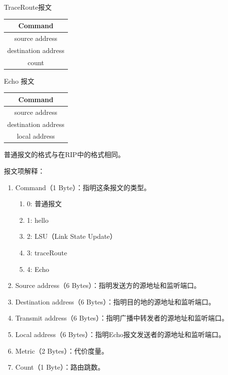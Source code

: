 TraceRoute报文
\begin{table}[H]
	\centering
	\begin{tabular}{|c|}
		\hline              
		Command             \\
		\hline              
		source address      \\
		\hline              
		destination address \\
		\hline              
		count               \\
		\hline              
	\end{tabular}		
\end{table}	

Echo 报文
\begin{table}[H]
	\centering
	\begin{tabular}{|c|}
		\hline              
		Command             \\
		\hline              
		source address      \\
		\hline              
		destination address \\
		\hline              
		local address       \\
		\hline              
	\end{tabular}		
\end{table}
普通报文的格式与在RIP中的格式相同。
\newpage
\par 报文项解释：
\begin{enumerate}[(1)]
	\item Command（1 Byte）：指明这条报文的类型。
	      \begin{enumerate}[]
	      	\item 0: 普通报文
	      	\item 1: hello
	      	\item 2: LSU（Link State Update）
	      	\item 3: traceRoute
	      	\item 4: Echo
	      \end{enumerate}
	\item Source address（6 Bytes）：指明发送方的源地址和监听端口。
	\item Destination address（6 Bytes）：指明目的地的源地址和监听端口。
	\item Transmit address（6 Bytes）：指明广播中转发者的源地址和监听端口。
	\item Local address（6 Bytes）：指明Echo报文发送者的源地址和监听端口。
	\item Metric（2 Bytes）：代价度量。
	\item Count（1 Byte）：路由跳数。
	\end{enumerate}
	
